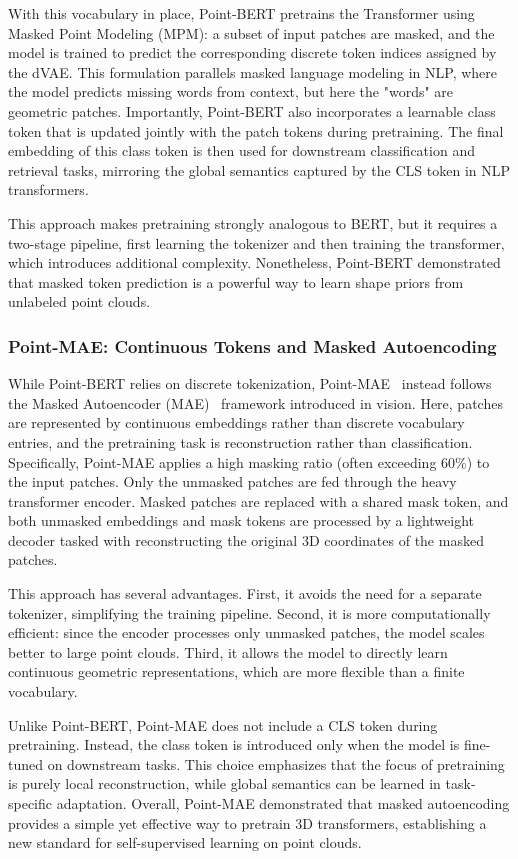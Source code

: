 With this vocabulary in place, Point-BERT pretrains the Transformer using Masked Point Modeling (MPM): a subset of input patches are masked, and the model is trained to predict the corresponding discrete token indices assigned by the dVAE. This formulation parallels masked language modeling in NLP, where the model predicts missing words from context, but here the "words" are geometric patches. Importantly, Point-BERT also incorporates a learnable class token that is updated jointly with the patch tokens during pretraining. The final embedding of this class token is then used for downstream classification and retrieval tasks, mirroring the global semantics captured by the CLS token in NLP transformers.

This approach makes pretraining strongly analogous to BERT, but it requires a two-stage pipeline, first learning the tokenizer and then training the transformer, which introduces additional complexity. Nonetheless, Point-BERT demonstrated that masked token prediction is a powerful way to learn shape priors from unlabeled point clouds.

\subsubsection{Point-MAE: Continuous Tokens and Masked Autoencoding}

While Point-BERT relies on discrete tokenization, Point-MAE~\cite{pmae} instead follows the Masked Autoencoder (MAE)~\cite{mae} framework introduced in vision. Here, patches are represented by continuous embeddings rather than discrete vocabulary entries, and the pretraining task is reconstruction rather than classification. Specifically, Point-MAE applies a high masking ratio (often exceeding 60\%) to the input patches. Only the unmasked patches are fed through the heavy transformer encoder. Masked patches are replaced with a shared mask token, and both unmasked embeddings and mask tokens are processed by a lightweight decoder tasked with reconstructing the original 3D coordinates of the masked patches.

This approach has several advantages. First, it avoids the need for a separate tokenizer, simplifying the training pipeline. Second, it is more computationally efficient: since the encoder processes only unmasked patches, the model scales better to large point clouds. Third, it allows the model to directly learn continuous geometric representations, which are more flexible than a finite vocabulary.

Unlike Point-BERT, Point-MAE does not include a CLS token during pretraining. Instead, the class token is introduced only when the model is fine-tuned on downstream tasks. This choice emphasizes that the focus of pretraining is purely local reconstruction, while global semantics can be learned in task-specific adaptation. Overall, Point-MAE demonstrated that masked autoencoding provides a simple yet effective way to pretrain 3D transformers, establishing a new standard for self-supervised learning on point clouds.

